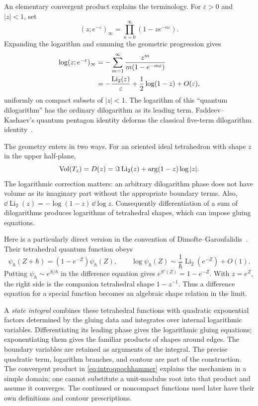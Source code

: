 An elementary convergent product explains the terminology. For
$\varepsilon>0$ and $|z|<1$, set
\[
 (z;e^{-\varepsilon})_\infty
      =\prod_{n=0}^\infty(1-ze^{-n\varepsilon}).
\]
Expanding the logarithm and summing the geometric progression gives
\begin{align}
 \log(z;e^{-\varepsilon})_\infty
 &=-\sum_{m=1}^\infty
       \frac{z^m}{m(1-e^{-m\varepsilon})}\notag\\
 &=-\frac{\operatorname{Li}_2(z)}{\varepsilon}
       +\frac12\log(1-z)+O(\varepsilon),
 \label{eq:introqpochhammer}
\end{align}
uniformly on compact subsets of $|z|<1$.
The logarithm of this ``quantum dilogarithm'' has the ordinary
dilogarithm as its leading term. Faddeev--Kashaev's quantum
pentagon identity deforms the classical five-term dilogarithm
identity~\cite{FaddeevKashaev}.

The geometry enters in two ways. For an oriented ideal tetrahedron
with shape $z$ in the upper half-plane,
\begin{equation}
 \operatorname{Vol}(T_z)=D(z)
 =\Im\operatorname{Li}_2(z)+\arg(1-z)\log|z|.
 \label{eq:introBlochWigner}
\end{equation}
The logarithmic correction matters: an arbitrary dilogarithm phase
does not have volume as its imaginary part without the appropriate
boundary terms. Also,
$\dd\operatorname{Li}_2(z)=-\log(1-z)\,\dd\log z$.
Consequently differentiation of a sum of dilogarithms produces
logarithms of tetrahedral shapes, which can impose gluing equations.

Here is a particularly direct version in the convention of
Dimofte--Garoufalidis~\cite[Section 5.1]{DimofteGaroufalidis}.
Their tetrahedral quantum function obeys
\begin{equation}
 \psi_\hbar(Z+\hbar)=(1-e^{-Z})\psi_\hbar(Z),\qquad
 \log\psi_\hbar(Z)\sim\frac1\hbar\operatorname{Li}_2(e^{-Z})+O(1).
 \label{eq:introquantumshape}
\end{equation}
Putting $\psi_\hbar\sim e^{S/\hbar}$ in the difference equation
gives $e^{S'(Z)}=1-e^{-Z}$. With $z=e^Z$, the right side is
the companion tetrahedral shape $1-z^{-1}$. Thus a difference
equation for a special function becomes an algebraic shape relation
in the limit.

A \emph{state integral} combines these tetrahedral functions with
quadratic exponential factors determined by the gluing data and
integrates over internal logarithmic variables. Differentiating its
leading phase gives the logarithmic gluing equations; exponentiating
them gives the familiar products of shapes around edges. The
boundary variables are retained as arguments of the integral.
The precise quadratic term, logarithm branches, and contour are
part of the construction. The convergent product in
\eqref{eq:introqpochhammer} explains the mechanism in a simple
domain; one cannot substitute a unit-modulus root into that product
and assume it converges. The continued or noncompact functions used
later have their own definitions and contour prescriptions.
